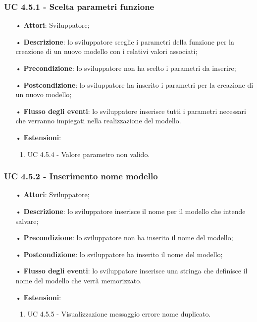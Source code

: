 \subsubsection{UC 4.5.1 - Scelta parametri funzione}
\begin{itemize}
\item[•]\textbf{Attori}: Sviluppatore;
\item[•]\textbf{Descrizione}: lo sviluppatore sceglie i parametri della funzione per la creazione di un nuovo modello con i relativi valori associati;
\item[•]\textbf{Precondizione}: lo sviluppatore non ha scelto i parametri da inserire;
\item[•]\textbf{Postcondizione}: lo sviluppatore ha inserito i parametri per la creazione di un nuovo modello;
\item[•]\textbf{Flusso degli eventi}:  lo sviluppatore inserisce tutti i parametri necessari che verranno impiegati nella realizzazione del modello.
\item[•] \textbf{Estensioni}: 
\begin{enumerate}
	\item UC 4.5.4 - Valore parametro non valido.
\end{enumerate}
\end{itemize}

\subsubsection{UC 4.5.2 - Inserimento nome modello}
\begin{itemize}
\item[•]\textbf{Attori}: Sviluppatore;
\item[•]\textbf{Descrizione}: lo sviluppatore inserisce il nome per il modello che intende salvare;
\item[•]\textbf{Precondizione}: lo sviluppatore non ha inserito il nome del modello;
\item[•]\textbf{Postcondizione}: lo sviluppatore ha inserito il nome del modello;
\item[•]\textbf{Flusso degli eventi}: lo sviluppatore inserisce una stringa che definisce il nome del modello che verrà memorizzato.
\item[•] \textbf{Estensioni}: 
\begin{enumerate}
	\item UC 4.5.5 - Visualizzazione messaggio errore nome duplicato.
\end{enumerate}
\end{itemize}


